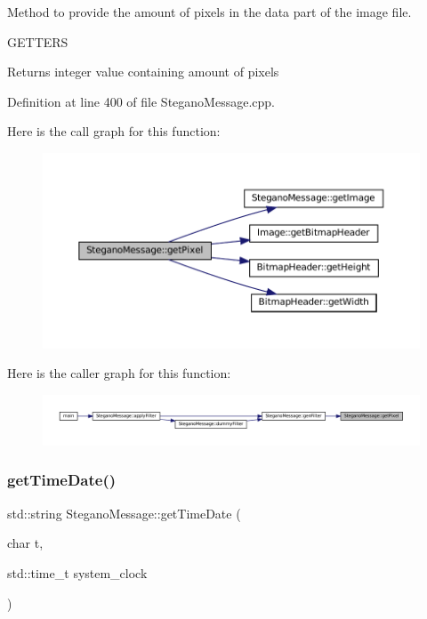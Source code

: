Method to provide the amount of pixels in the data part of the image file. 

G\+E\+T\+T\+E\+RS\begin{DoxyReturn}{Returns}
integer value containing amount of pixels 
\end{DoxyReturn}


Definition at line 400 of file Stegano\+Message.\+cpp.

Here is the call graph for this function\+:\nopagebreak
\begin{figure}[H]
\begin{center}
\leavevmode
\includegraphics[width=350pt]{classSteganoMessage_a12231d3596b90fe4c6d67bd694b27d07_cgraph}
\end{center}
\end{figure}
Here is the caller graph for this function\+:\nopagebreak
\begin{figure}[H]
\begin{center}
\leavevmode
\includegraphics[width=350pt]{classSteganoMessage_a12231d3596b90fe4c6d67bd694b27d07_icgraph}
\end{center}
\end{figure}
\mbox{\label{classSteganoMessage_a9aaa5e476220c95e1a68b4d722de43b1}} 
\subsubsection{\texorpdfstring{getTimeDate()}{getTimeDate()}}
{\footnotesize\ttfamily std\+::string Stegano\+Message\+::get\+Time\+Date (\begin{DoxyParamCaption}\item[{char}]{t,  }\item[{std\+::time\+\_\+t}]{system\+\_\+clock }\end{DoxyParamCaption})\hspace{0.3cm}{\ttfamily [static]}}



